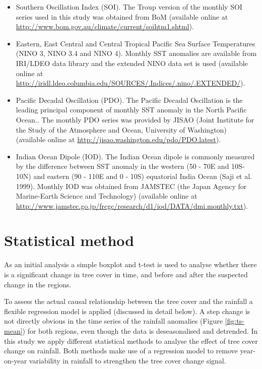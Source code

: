 \documentclass[fleqn,10pt,lineno]{wlpeerj} %
\providecommand{\tightlist}{
\setlength{\itemsep}{0pt}\setlength{\parskip}{0pt}}
\begin{document}
\begin{itemize}
\tightlist
\item
  Southern Oscillation Index (SOI). The Troup version of the monthly SOI
  series used in this study was obtained from BoM (available online at
  \url{http://www.bom.gov.au/climate/current/soihtm1.shtml}).\\
\item
  Eastern, East Central and Central Tropical Pacific Sea Surface
  Temperatures (NINO 3, NINO 3.4 and NINO 4). Monthly SST anomalies are
  available from IRI/LDEO data library and the extended NINO data set is
  used (available online at
  \url{http://iridl.ldeo.columbia.edu/SOURCES/.Indices/.nino/.EXTENDED/}).\\
\item
  Pacific Decadal Oscillation (PDO). The Pacific Decadal Oscillation is
  the leading principal component of monthly SST anomaly in the North
  Pacific Ocean.. The monthly PDO series was provided by JISAO (Joint
  Institute for the Study of the Atmosphere and Ocean, University of
  Washington) (available online at
  \url{http://jisao.washington.edu/pdo/PDO.latest}).\\
\item
  Indian Ocean Dipole (IOD). The Indian Ocean dipole is commonly
  measured by the difference between SST anomaly in the western (50 -
  70\textdegree E and 10\textdegree S-10\textdegree N) and eastern (90 -
  110\textdegree E and 0 - 10\textdegree S) equatorial India Ocean (Saji
  et al. 1999). Monthly IOD was obtained from JAMSTEC (the Japan Agency
  for Marine-Earth Science and Technology) (available online at
  \url{http://www.jamstec.go.jp/frcgc/research/d1/iod/DATA/dmi.monthly.txt}).
\end{itemize}

\section{Statistical method}\label{statistical-method}

As an initial analysis a simple boxplot and t-test is used to analyse
whether there is a significant change in tree cover in time, and before
and after the suspected change in the regions.

To assess the actual causal relationship between the tree cover and the
rainfall a flexible regression model is applied (discussed in detail
below). A step change is not directly obvious in the time series of the
rainfall anomalies (Figure \ref{fig:ts-mean}) for both regions, even
though the data is deseasonalised and detrended. In this study we apply
different statistical methods to analyse the effect of tree cover change
on rainfall. Both methods make use of a regression model to remove
year-on-year variability in rainfall to strengthen the tree cover change
signal.
\end{document}
